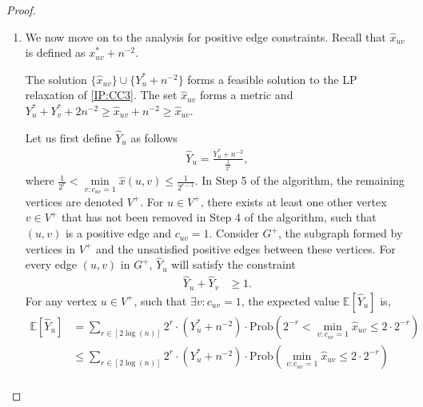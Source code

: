 \begin{proof}
\begin{enumerate}
	\item We now move on to the analysis for positive edge constraints. Recall that $\hat{x}_{uv}$ is defined as $x_{uv}^* + n^{-2}$. 
	\begin{observation} The solution $\{ \hat{x}_{uv} \} \cup \{ Y_u^* + n^{-2} \}$ forms a feasible solution to the LP relaxation of \ref{IP:CC3}. The set $\hat{x}_{uv}$ forms a metric and $Y_u^* + Y_v^* + 2n^{-2} \ge \hat{x}_{uv} + n^{-2} \ge \hat{x}_{uv}$.
	\end{observation}
	Let us first define $\hat{Y}_u$ as follows
	\begin{align*}
	    \hat{Y}_{u}=\frac{Y_u^* + n^{-2}}{\frac{1}{2^r}},
	\end{align*}
	where $\frac{1}{2^{r}} < \underset{v : c_{uv} = 1}{\min} \hat{x} (u,v) \le \frac{1}{2^{r-1}}$. In Step 5 of the algorithm, the remaining vertices are denoted $V^+$. For $u \in V^+$, there exists at least one other vertex $v \in V^+$ that has not been removed in Step 4 of the algorithm, such that $(u,v)$ is a positive edge and $c_{uv} = 1$. Consider $G^+$, the subgraph formed by vertices in $V^+$ and the unsatisfied positive edges between these vertices. For every edge $(u,v)$ in $G^+$, $\hat{Y}_u$ will satisfy the constraint
	\begin{align} \label{eq:vcconstraint}
	    \hat{Y}_{u} + \hat{Y}_{v} &\geq 1.
	\end{align}
	For any vertex $u \in V^+$, such that $\exists v : c_{uv} = 1$, the expected value $\mathbb{E} [ \hat{Y}_{u} ]$ is,
	\begin{align}
	    \mathbb{E} [\hat{Y}_{u}] &= \sum_{r \in [2 \log(n)]} 2^{r} \cdot (Y_u^* + n^{-2}) \cdot \mathrm{Prob} \left( 2^{-r} < \min_{v : c_{uv} = 1} \hat{x}_{uv} \le 2 \cdot 2^{-r} \right) \nonumber\\
	    &\le \sum_{r \in [2 \log(n)]} 2^{r} \cdot (Y_u^* + n^{-2}) \cdot \mathrm{Prob} \left( \min_{v : c_{uv} = 1} \hat{x}_{uv} \le 2 \cdot 2^{-r} \right) \nonumber\\

\end{align}
\end{enumerate}
\end{proof}

